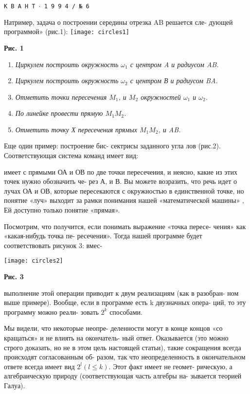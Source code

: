 \newpage

\centering
\texttt{{\large К В А Н Т  $\cdot$ 1 9 9 4 / № 6}}

\begin{multicols}{3}
\justifying
Натример, задача о построении
середины отрезка AB решается сле-
дующей программой» (рис.1):
\texttt{[image: circles1]}
\raggedright
\textbf{Рис.  1}

\begin{enumerate}
\item \small \textit{Циркулем построить окружность $\omega_1$ с центром A и радиусом AB.}
\item \small \textit{Циркулем построить окружность $\omega_2$ с центром В и радиусом BA.}
\item \small \textit{Отметить точки пересечения $M_{1}$,  и 
$M_{2}$ окружностей $ \omega_{1}$ и $\omega_{2}$.}
\item \small \textit{По линейке провести прямую $M_{1}M_{2}$.  \\}
\item \small \textit{Отметить точку Х пересечения прямых $M_{1}M_{2}$,  и AB.}
\end{enumerate}

\justifying
Еще один пример: построение бис-
сектрисы заданного угла лов
(рис.2). Соответствующая система
команд имеет вид:

\columnbreak
имеет с прямыми ОА и ОВ по две
точки пересечения, и неясно, какие
из этих точек нужно обозначить че-
рез А, и В.  Вы можете возразить,
что речь идет о лучах ОА и ОВ,
которые пересекаются с окружностью
в единственной точке, но понятие
«луч» выходит за рамки понимания
нашей «математической машины» ‚ Ей
доступно только понятие «прямая».

Посмотрим, что получится, если
понимать выражение «точка пересе-
чения» как «какая-нибудь точка пе-
ресечения». Тогда нашей программе
будет соответствовать рисунок 3: вмес-

\texttt{[image: circles2]}
\raggedright
\textbf{Рис.  3}

\columnbreak
выполнение этой операции приводит
к двум реализациям (как в разобран-
ном выше примере). Вообще, если в
программе есть k двузначных опера-
ций, то эту программу можно реали-
зовать $2^k$ способами.

Мы видели, что некоторые неопре-
деленности могут в конце концов «со
кращаться» и не влиять на окончатель-
ный ответ. Оказывается (это можно
строго доказать, но не в этом цель
настоящей статьи), такие сокращения
всегда происходят согласованным об-
разом, так что неопределенность в
окончательном ответе всегда имеет вид
$2^l (l \leq k)$. Этот факт имеет не геомет-
рическую, а алгебраическую природу
(соответствующая часть алгебры на-
зывается теорией Галуа).


\end{multicols}
